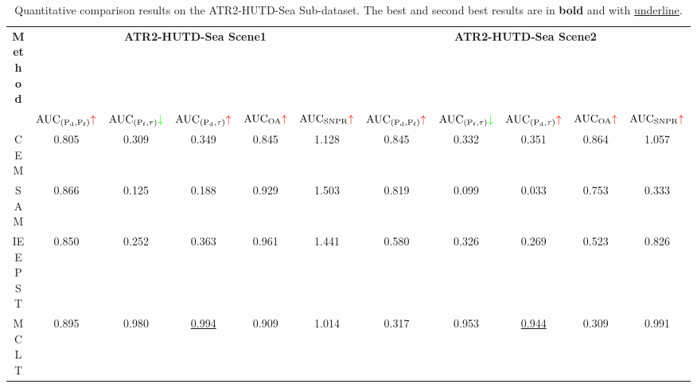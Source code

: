 \begin{table*}[!t] 
    \centering
    \footnotesize   
    \caption{Quantitative comparison results on the ATR2-HUTD-Sea Sub-dataset. The best and second best results are in \textbf{bold} and with \underline{underline}.} \label{auc_sea}
    \renewcommand{\arraystretch}{1.5}
    \setlength{\tabcolsep}{1.85mm}
    \scalebox{0.875}
    {
        \begin{tabular}{ccccccccccc}
            \hline
            \multirow{2.4}{*}{\textbf{Method}} & \multicolumn{5}{c}{\cellcolor{tablecolor11}\textbf{ATR2-HUTD-Sea Scene1}}       & \multicolumn{5}{c}{\cellcolor{tablecolor12!50}\textbf{ATR2-HUTD-Sea Scene2}}       \\ \cmidrule(lr){2-6} \cmidrule(lr){7-11}
                                    & $\text{AUC}_{( \mathrm{P}_{\mathrm{d}},\mathrm{P}_{\mathrm{f}})}\textcolor{red}{\uparrow }$ & $\text{AUC}_{( \mathrm{P}_{\mathrm{f}}, \tau)}\textcolor{green}{\downarrow }$ & $\text{AUC}_{( \mathrm{P}_{\mathrm{d}},\tau)}\textcolor{red}{\uparrow }$ & $\mathrm{AUC}_{\mathrm{OA}} \textcolor{red}{\uparrow }$ & $\mathrm{AUC}_{\mathrm{SNPR}}\textcolor{red}{\uparrow }$ & $\text{AUC}_{( \mathrm{P}_{\mathrm{d}},\mathrm{P}_{\mathrm{f}})}\textcolor{red}{\uparrow }$ & $\text{AUC}_{( \mathrm{P}_{\mathrm{f}}, \tau)}\textcolor{green}{\downarrow }$ & $\text{AUC}_{( \mathrm{P}_{\mathrm{d}},\tau)}\textcolor{red}{\uparrow }$ & $\mathrm{AUC}_{\mathrm{OA}} \textcolor{red}{\uparrow }$ & $\mathrm{AUC}_{\mathrm{SNPR}}\textcolor{red}{\uparrow }$ \\ \hline
                                    CEM         & 0.805          & 0.309          & 0.349          & 0.845          & 1.128           & 0.845          & 0.332          & 0.351          & 0.864          & 1.057          \\
                                    SAM         & 0.866          & 0.125    & 0.188          & 0.929          & 1.503           & 0.819          & 0.099          & 0.033          & 0.753          & 0.333          \\
                                    IEEPST      & 0.850          & 0.252          & 0.363          & 0.961          & 1.441           & 0.580          & 0.326          & 0.269          & 0.523          & 0.826          \\
                                    MCLT        & 0.895          & 0.980          & \underline{0.994} & 0.909          & 1.014           & 0.317          & 0.953          & \underline{0.944}    & 0.309          & 0.991          \\

\end{tabular}}
\end{table*}
